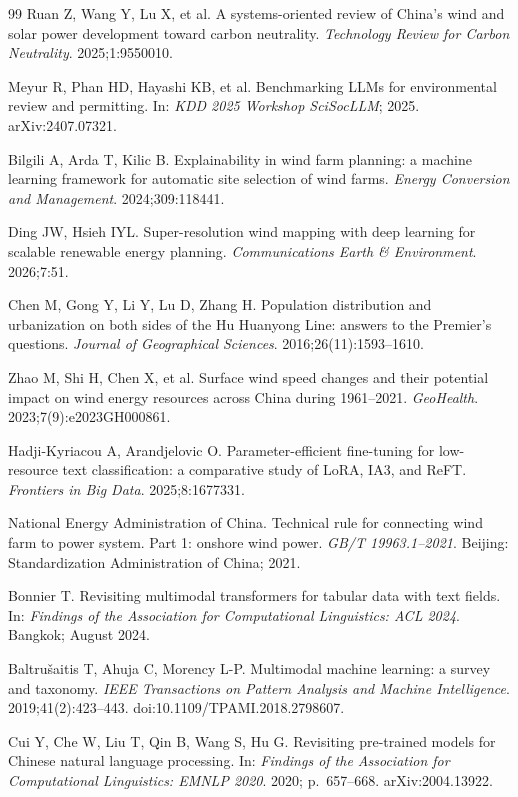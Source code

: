 \documentclass[12pt, a4paper]{article}
\begin{document}
\begin{thebibliography}{99}
Ruan Z, Wang Y, Lu X, et al.
A systems-oriented review of China's wind and solar power
development toward carbon neutrality.
\textit{Technology Review for Carbon Neutrality}.
2025;1:9550010.

Meyur R, Phan HD, Hayashi KB, et al.
Benchmarking LLMs for environmental review and permitting.
In: \textit{KDD 2025 Workshop SciSocLLM}; 2025.
arXiv:2407.07321.

Bilgili A, Arda T, Kilic B.
Explainability in wind farm planning: a machine learning
framework for automatic site selection of wind farms.
\textit{Energy Conversion and Management}.
2024;309:118441.

Ding JW, Hsieh IYL.
Super-resolution wind mapping with deep learning for scalable
renewable energy planning.
\textit{Communications Earth \& Environment}.
2026;7:51.

Chen M, Gong Y, Li Y, Lu D, Zhang H.
Population distribution and urbanization on both sides of the
Hu Huanyong Line: answers to the Premier's questions.
\textit{Journal of Geographical Sciences}.
2016;26(11):1593--1610.

Zhao M, Shi H, Chen X, et al.
Surface wind speed changes and their potential impact on wind
energy resources across China during 1961--2021.
\textit{GeoHealth}.
2023;7(9):e2023GH000861.

Hadji-Kyriacou A, Arandjelovic O.
Parameter-efficient fine-tuning for low-resource text
classification: a comparative study of LoRA, IA3, and ReFT.
\textit{Frontiers in Big Data}.
2025;8:1677331.

National Energy Administration of China.
Technical rule for connecting wind farm to power system.
Part 1: onshore wind power.
\textit{GB/T 19963.1--2021}.
Beijing: Standardization Administration of China; 2021.

Bonnier T.
Revisiting multimodal transformers for tabular data with
text fields.
In: \textit{Findings of the Association for Computational
Linguistics: ACL 2024}.
Bangkok; August 2024.

Baltrušaitis T, Ahuja C, Morency L-P.
Multimodal machine learning: a survey and taxonomy.
\textit{IEEE Transactions on Pattern Analysis and Machine
Intelligence}. 2019;41(2):423--443.
doi:10.1109/TPAMI.2018.2798607.

Cui Y, Che W, Liu T, Qin B, Wang S, Hu G.
Revisiting pre-trained models for Chinese natural language
processing.
In: \textit{Findings of the Association for Computational
Linguistics: EMNLP 2020}. 2020; p.\ 657--668.
arXiv:2004.13922.


\end{thebibliography}
\end{document}

